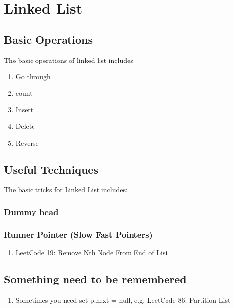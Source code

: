 \chapter{ Linked List }

\section{ Basic Operations  }
The basic operations of linked list includes
\begin{enumerate}
    \item Go through

    \item count

    \item Insert

    \item Delete

    \item Reverse

\end{enumerate}

\section{ Useful Techniques  }
The basic tricks for Linked List includes:

\subsection { Dummy head }


\subsection { Runner Pointer (Slow Fast Pointers)}
\begin{enumerate}
    \item LeetCode 19: Remove Nth Node From End of List


\end{enumerate}

\section{ Something need to be remembered  }

\begin{enumerate}
    \item Sometimes you need set p.next = null, e.g. LeetCode 86: Partition List


\end{enumerate}


